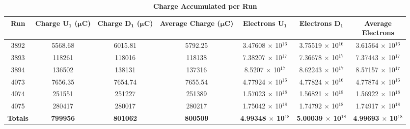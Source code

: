 \begin{table}[!h]
\centering
\begin{tabular}{|c c c c c c c|}
\hline
\textbf{Run} & \makecell{\textbf{Charge}\\ $\boldsymbol{U_1}$ \\ ($\boldsymbol{\mu C}$)} & \makecell{\textbf{Charge}\\ $\boldsymbol{D_1}$ \\ ($\boldsymbol{\mu C}$)} & \makecell{\textbf{Average}\\ \textbf{Charge}\\ ($\boldsymbol{\mu C}$)} & \makecell{\textbf{Electrons} \\ $\boldsymbol{U_1}$} & \makecell{\textbf{Electrons} \\ $\boldsymbol{D_1}$} & \makecell{\textbf{Average} \\ \textbf{Electrons}}\\
\hline
3892 & 5568.68 & 6015.81 & 5792.25 & 3.47608 $\times$ 10$^{16}$ & 3.75519 $\times$ 10$^{16}$ & 3.61564 $\times$ 10$^{16}$ \\
3893 & 118261 & 118016 & 118138 & 7.38207 $\times$ 10$^{17}$ & 7.36678 $\times$ 10$^{17}$ & 7.37443 $\times$ 10$^{17}$ \\
3894 & 136502 & 138131 & 137316 & 8.5207 $\times$ 10$^{17}$ & 8.62243 $\times$ 10$^{17}$ & 8.57157 $\times$ 10$^{17}$ \\
4073 & 7656.35 & 7654.74 & 7655.54 & 4.77924 $\times$ 10$^{16}$ & 4.77824 $\times$ 10$^{16}$ & 4.77874 $\times$ 10$^{16}$ \\
4074 & 251551 & 251227 & 251389 & 1.57023 $\times$ 10$^{18}$ & 1.56821 $\times$ 10$^{18}$ & 1.56922 $\times$ 10$^{18}$ \\
4075 & 280417 & 280017 & 280217 & 1.75042 $\times$ 10$^{18}$ & 1.74792 $\times$ 10$^{18}$ & 1.74917 $\times$ 10$^{18}$ \\
\hline
\textbf{Totals} & \textbf{799956} & \textbf{801062} & \textbf{800509} & \textbf{4.99348 $\times$ 10$^{18}$} & \textbf{5.00039 $\times$ 10$^{18}$} & \textbf{4.99693 $\times$ 10$^{18}$} \\
\hline
\end{tabular}
\caption[Charge Accumulated per Run]{\bf{Charge Accumulated per Run}}
\label{tab:charges}
\end{table}

